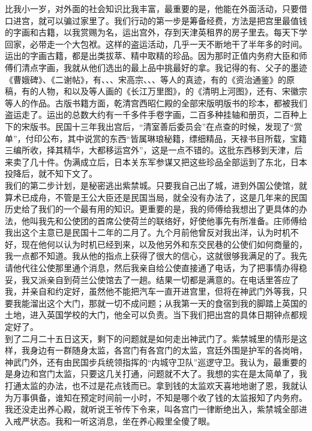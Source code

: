 比我小一岁，对外面的社会知识比我丰富，最重要的是，他能在外面活动，只要借口进宫，就可以骗过家里了。我们行动的第一步是筹备经费，方法是把宫里最值钱的字画和古籍，以我赏赐为名，运出宫外，存到天津英租界的房子里去。每天下学回家，必带走一个大包袱。这样的盗运活动，几乎一天不断地干了半年多的时间。运出的字画古籍，都是出类拔萃、精中取精的珍品。因为那时正值内务府大臣和师傅们清点字画，我就从他们选出的最上品中挑最好的拿。我记得的有、父子的墨迹《曹娥碑》、《二谢帖》，有、、、宋高宗、、、等人的真迹，有的《资治通鉴》的原稿，有的人物，和以及等人画的《长江万里图》，的《清明上河图》，还有、宋徽宗等人的作品。古版书籍方面，乾清宫西昭仁殿的全部宋版明版书的珍本，都被我们盗运走了。运出的总数大约有一千多件手卷字画，二百多种挂轴和册页，二百种上下的宋版书。民国十三年我出宫后，“清室善后委员会”在点查的时候，发现了“赏单”，付印公布，其中说赏的东西“皆属琳琅秘籍，缥细精品，天禄书目所载，宝籍三编所收，择其精华，大都移运宫外”，这是一点不错的。这批东西移到天津，后来卖了几十件。伪满成立后，日本关东军参谋又把这些珍品全部运到了东北，日本投降后，就不知下文了。\\

我们的第二步计划，是秘密逃出紫禁城。只要我自己出了城，进到外国公使馆，就算术已成舟，不管是王公大臣还是民国当局，就全没有办法了，这是几年来的民国历史给了我们的一个最有用的知识。更重要的是，我的师傅给我想出了更具体的办法，他叫我先和公使团的首席公使荷兰的联络好，好使他事先有所准备。庄师傅给我出这个主意已是民国十二年的二月了。九个月前他曾反对我出洋，认为时机不好，现在他何以认为时机已经到来，以及他另外和东交民巷的公使们如何商量的，我一点都不知道。我从他的指点上获得了很大的信心，这就很够我满足的了。我先请他代往公使那里通个消息，然后我亲自给公使直接通了电话，为了把事情办得稳妥，我又派亲自到荷兰公使馆去了一趟。结果一切都是满意的。在电话里答应了我，并亲自和约定好，虽然他不能把汽车一直开进宫里，但将在神武门外等我，只要我能溜出这个大门，那就一切不成问题；从我第一天的食宿到我的脚踏上英国的土地，进入英国学校的大门，他全可以负责。当下我们把出宫的具体日期钟点都规定好了。\\

到了二月二十五日这天，剩下的问题就是如何走出神武门了。紫禁城里的情形是这样，我身边有一群随身太监，各宫门有各宫门的太监，宫廷外围是护军的各岗哨，神武门外，还有由民国步兵统领指挥的“内城守卫队”巡逻守卫。我认为，最重要的是身边和宫门太监，只要这几关打通，问题就不大了。我想的实在是太简单了，我打通太监的办法，也不过是花点钱而已。拿到钱的太监欢天喜地地谢了恩，我就认为万事俱备，谁知在预定时间前一小时，不知是哪个收了钱的太监报知了内务府。我还没走出养心殿，就听说王爷传下令来，叫各宫门一律断绝出入，紫禁城全部进入戒严状态。我和一听这消息，坐在养心殿里全傻了眼。\\

